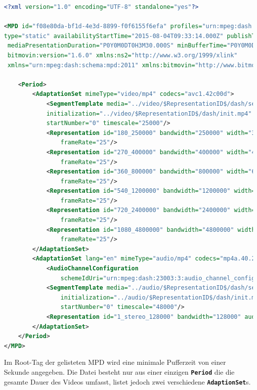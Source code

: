 \documentclass[paper = a4, fontsize = 12pt, parskip = half]{scrartcl} %
\def\elem#1{\texttt{\textbf{#1}}}
\begin{document}
\begin{lstlisting}[language=XML,basicstyle=\tiny]
<?xml version="1.0" encoding="UTF-8" standalone="yes"?>

<MPD id="f08e80da-bf1d-4e3d-8899-f0f6155f6efa" profiles="urn:mpeg:dash:profile:isoff-main:2011"
type="static" availabilityStartTime="2015-08-04T09:33:14.000Z" publishTime="2015-08-04T10:47:32.000Z"
 mediaPresentationDuration="P0Y0M0DT0H3M30.000S" minBufferTime="P0Y0M0DT0H0M1.000S" 
 bitmovin:version="1.6.0" xmlns:ns2="http://www.w3.org/1999/xlink" 
 xmlns="urn:mpeg:dash:schema:mpd:2011" xmlns:bitmovin="http://www.bitmovin.net/mpd/2015">

    <Period>
        <AdaptationSet mimeType="video/mp4" codecs="avc1.42c00d">
            <SegmentTemplate media="../video/$RepresentationID$/dash/segment_$Number$.m4s" 
            initialization="../video/$RepresentationID$/dash/init.mp4" duration="100000" 
            startNumber="0" timescale="25000"/>
            <Representation id="180_250000" bandwidth="250000" width="320" height="180" 
                frameRate="25"/>
            <Representation id="270_400000" bandwidth="400000" width="480" height="270"  
                frameRate="25"/>
            <Representation id="360_800000" bandwidth="800000" width="640" height="360" 
                frameRate="25"/>
            <Representation id="540_1200000" bandwidth="1200000" width="960" height="540"  
                frameRate="25"/>
            <Representation id="720_2400000" bandwidth="2400000" width="1280" height="720"  
                frameRate="25"/>
            <Representation id="1080_4800000" bandwidth="4800000" width="1920" height="1080" 
                frameRate="25"/>
        </AdaptationSet>
        <AdaptationSet lang="en" mimeType="audio/mp4" codecs="mp4a.40.2" bitmovin:label="English stereo">
            <AudioChannelConfiguration 
                schemeIdUri="urn:mpeg:dash:23003:3:audio_channel_configuration:2011" value="2"/>
            <SegmentTemplate media="../audio/$RepresentationID$/dash/segment_$Number$.m4s" 
                initialization="../audio/$RepresentationID$/dash/init.mp4" duration="191472" 
                startNumber="0" timescale="48000"/>
            <Representation id="1_stereo_128000" bandwidth="128000" audioSamplingRate="48000"/>
        </AdaptationSet>
    </Period>
</MPD>
\end{lstlisting}

Im Root-Tag der gelisteten MPD wird eine minimale Pufferzeit von einer Sekunde angegeben. Die Datei besteht nur aus einer einzigen \elem{Period} die die gesamte Dauer des Videos umfasst, listet jedoch zwei verschiedene \elem{AdaptionSet}s. 
\end{document}

